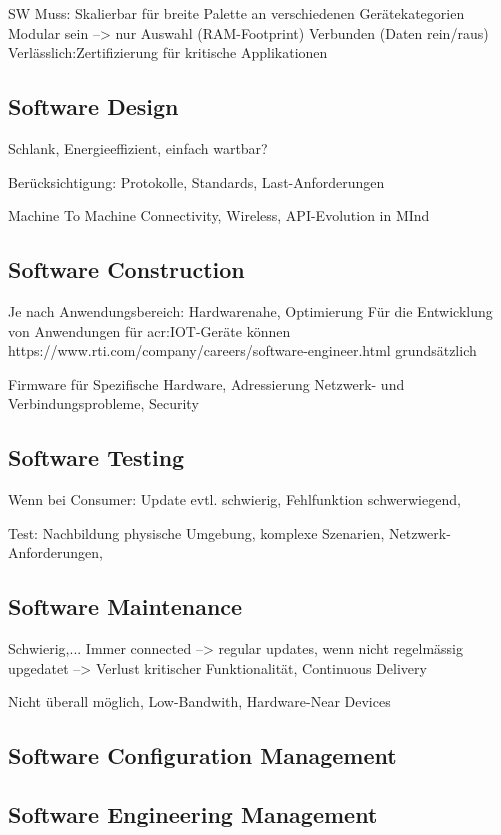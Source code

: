 SW Muss: Skalierbar für breite Palette an verschiedenen Gerätekategorien
Modular sein --> nur Auswahl (RAM-Footprint)
Verbunden (Daten rein/raus)
Verlässlich:Zertifizierung für kritische Applikationen
\subsection{Software Design}
Schlank, Energieeffizient, einfach wartbar?

Berücksichtigung: Protokolle, Standards, Last-Anforderungen

Machine To Machine Connectivity, Wireless, API-Evolution in MInd
\subsection{Software Construction}
Je nach Anwendungsbereich: Hardwarenahe, Optimierung
Für die Entwicklung von Anwendungen für \gls{acr:IOT}-Geräte können
https://www.rti.com/company/careers/software-engineer.html grundsätzlich


Firmware für Spezifische Hardware, Adressierung Netzwerk- und Verbindungsprobleme, Security


\subsection{Software Testing}
Wenn bei Consumer: Update evtl. schwierig, Fehlfunktion schwerwiegend,

Test: Nachbildung physische Umgebung, komplexe Szenarien, Netzwerk-Anforderungen, 

\subsection{Software Maintenance}
Schwierig,...
Immer connected --> regular updates, wenn nicht regelmässig upgedatet --> Verlust kritischer Funktionalität, Continuous Delivery

Nicht überall möglich, Low-Bandwith, Hardware-Near Devices


\subsection{Software Configuration Management}


\subsection{Software Engineering Management}


